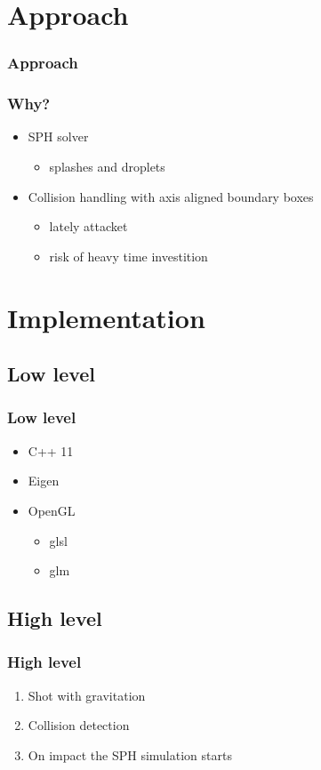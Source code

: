 \section{Approach}
\begin{frame}
	 {\frametitle{Approach}}
	 {\frametitle{Why?}}
	\begin{itemize}[<+->]
		\item<1-> SPH solver
			\begin{itemize}
				\item<2-> splashes and droplets
			\end{itemize}
		\item Collision handling with axis aligned boundary boxes
			\begin{itemize}
					\item<2-> lately attacket
					\item<2-> risk of heavy time investition
			\end{itemize}
	\end{itemize}
\end{frame}
\section{Implementation}
\subsection{Low level}
\begin{frame}
	\frametitle{Low level}
	\begin{itemize}
		\item C++ 11
		\item Eigen
		\item OpenGL
			\begin{itemize}
				\item glsl
				\item glm
			\end{itemize}
	\end{itemize}
\end{frame}
\subsection{High level}
\begin{frame}
	\frametitle{High level}
	\begin{enumerate}
		\item Shot with gravitation
		\item Collision detection
		\item On impact the SPH simulation starts
	\end{enumerate}
\end{frame}
